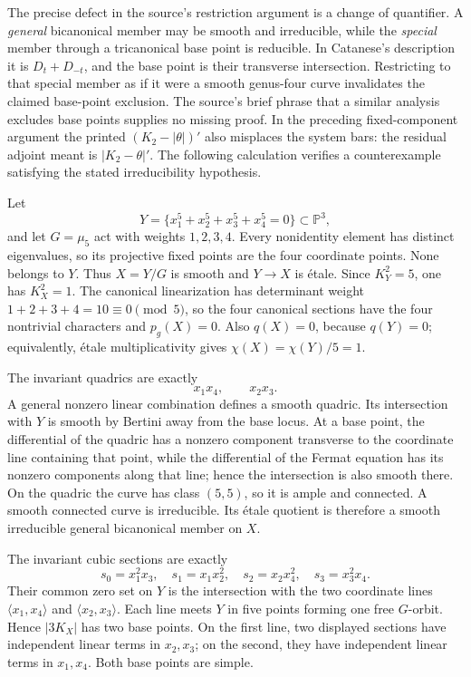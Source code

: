 The precise defect in the source's restriction argument is a change of quantifier. A \emph{general} bicanonical member may be smooth and irreducible, while the \emph{special} member through a tricanonical base point is reducible. In Catanese's description it is \(D_t+D_{-t}\), and the base point is their transverse intersection. Restricting to that special member as if it were a smooth genus-four curve invalidates the claimed base-point exclusion. The source's brief phrase that a similar analysis excludes base points supplies no missing proof. In the preceding fixed-component argument the printed \((K_2-|\theta|)'\) also misplaces the system bars: the residual adjoint meant is \(|K_2-\theta|'\). The following calculation verifies a counterexample satisfying the stated irreducibility hypothesis.

\begin{example}
\label{cp2-viii-godeaux-example}
Let
\[
Y=\{x_1^5+x_2^5+x_3^5+x_4^5=0\}\subset\mathbb P^3,
\]
and let \(G=\mu_5\) act with weights \(1,2,3,4\). Every nonidentity element has distinct eigenvalues, so its projective fixed points are the four coordinate points. None belongs to \(Y\). Thus \(X=Y/G\) is smooth and \(Y\to X\) is étale. Since \(K_Y^2=5\), one has \(K_X^2=1\). The canonical linearization has determinant weight \(1+2+3+4=10\equiv0\pmod5\), so the four canonical sections have the four nontrivial characters and \(p_g(X)=0\). Also \(q(X)=0\), because \(q(Y)=0\); equivalently, étale multiplicativity gives \(\chi(X)=\chi(Y)/5=1\).

The invariant quadrics are exactly
\[
x_1x_4,\qquad x_2x_3.
\]
A general nonzero linear combination defines a smooth quadric. Its intersection with \(Y\) is smooth by Bertini away from the base locus. At a base point, the differential of the quadric has a nonzero component transverse to the coordinate line containing that point, while the differential of the Fermat equation has its nonzero components along that line; hence the intersection is also smooth there. On the quadric the curve has class \((5,5)\), so it is ample and connected. A smooth connected curve is irreducible. Its étale quotient is therefore a smooth irreducible general bicanonical member on \(X\).

The invariant cubic sections are exactly
\[
s_0=x_1^2x_3,\quad s_1=x_1x_2^2,\quad
s_2=x_2x_4^2,\quad s_3=x_3^2x_4.
\]
Their common zero set on \(Y\) is the intersection with the two coordinate lines \(\langle x_1,x_4\rangle\) and \(\langle x_2,x_3\rangle\). Each line meets \(Y\) in five points forming one free \(G\)-orbit. Hence \(|3K_X|\) has two base points. On the first line, two displayed sections have independent linear terms in \(x_2,x_3\); on the second, they have independent linear terms in \(x_1,x_4\). Both base points are simple.


\end{example}
